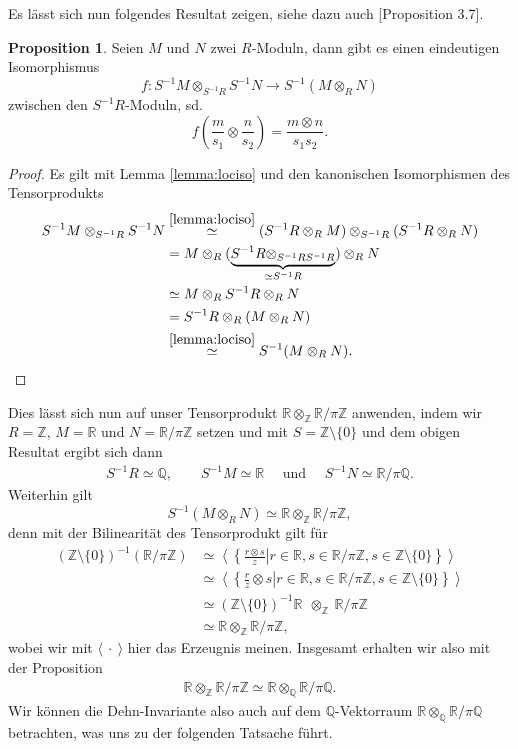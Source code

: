 \documentclass[11pt,titlepage]{article}
\newcommand{\setZ}{\mathbb{Z}}
\newcommand{\setQ}{\mathbb{Q}}
\newcommand{\setR}{\mathbb{R}}
\theoremstyle{definition}
\newtheorem{proposition}[theorem]{Proposition}
\theoremstyle{remark}
\begin{document}
	Es lässt sich nun folgendes Resultat zeigen, siehe dazu auch \cite{introductiontocomalg}[Proposition 3.7].
	
	\begin{proposition}\label{prop:tensoriso}
		Seien $M$ und $N$ zwei $R$-Moduln, dann gibt es einen eindeutigen 
		Isomorphismus 
		\[f:S^{-1}M\otimes_{S^{-1}R}S^{-1}N\to S^{-1}(M\otimes_R N)\]
		zwischen den $S^{-1}R$-Moduln, sd.
		\[f\left(\frac{m}{s_1}\otimes\frac{n}{s_2}\right)=\frac{m\otimes n}{s_1s_2}.\]
	\end{proposition}

	\begin{proof}
		Es gilt mit Lemma \ref{lemma:lociso} und den kanonischen Isomorphismen des 
		Tensorprodukts
		\begin{align*}
			S^{-1}M\otimes_{S^{-1}R}S^{-1}N &\overset{\ref{lemma:lociso}}{\simeq}
			(S^{-1}R\otimes_R M)\otimes_{S^{-1}R}(S^{-1}R\otimes_R N) \\
			&= M\otimes_R (\underbrace{S^{-1}R\otimes_{S^{-1}R S^{-1}R}}_{\simeq S^{-1}R})\otimes_R N \\
			&\simeq M\otimes_R S^{-1}R \otimes_R N \\
			&= S^{-1}R \otimes_R(M\otimes_R N) \\
			&\overset{\ref{lemma:lociso}}{\simeq} S^{-1}(M\otimes_R N).
		\end{align*}
	\end{proof}
	
	Dies lässt sich nun auf unser Tensorprodukt 
	$\setR\otimes_{\setZ}\setR /\pi\setZ$ anwenden, indem wir $R=\setZ$, $M=\setR$ und $N=\setR /\pi\setZ$ setzen und mit 
	$S=\setZ\setminus\{0\}$ und dem obigen Resultat ergibt sich 
	dann
	\begin{align*}
		S^{-1}R\simeq\setQ,\qquad S^{-1}M\simeq\setR
		\quad\text{ und }\quad S^{-1}N\simeq\setR /\pi\setQ.
	\end{align*}
	Weiterhin gilt
	\[S^{-1}(M\otimes_R N)\simeq \setR\otimes_\setZ\setR/\pi\setZ,\]
	denn mit der Bilinearität des Tensorprodukt gilt für 
	\begin{align*}
		(\setZ\setminus\{0\})^{-1}(\setR /\pi\setZ)&\simeq
		\left.\left\langle \left\{\frac{r\otimes s}{z}\right\vert
		 r\in\setR,s\in\setR/\pi\setZ,s\in\setZ\setminus\{0\}\right\}\right\rangle \\
		 &\simeq \left.\left\langle \left\{\frac{r}{z}\otimes s\right\vert r\in\setR,s\in\setR/\pi\setZ,s\in\setZ\setminus\{0\}\right\}
		 \right\rangle \\
		 &\simeq (\setZ\setminus\{0\})^{-1}\setR\ \ \otimes_\setZ\  \setR/\pi\setZ \\
		 &\simeq \setR\otimes_\setZ \setR/\pi\setZ,
	\end{align*}
	wobei wir mit $\langle\ \cdot\ \rangle$ hier das Erzeugnis meinen.
	Insgesamt erhalten wir also mit der Proposition
	\begin{align}
		\setR\otimes_\setZ\setR/\pi\setZ\simeq\setR\otimes_\setQ\setR/\pi\setQ. \label{tensor=0}
	\end{align}
	Wir können die Dehn-Invariante also auch auf dem $\setQ$-Vektorraum 
	$\setR\otimes_\setQ\setR/\pi\setQ$ betrachten, was uns zu der folgenden 
	Tatsache führt.
	
\end{document}
